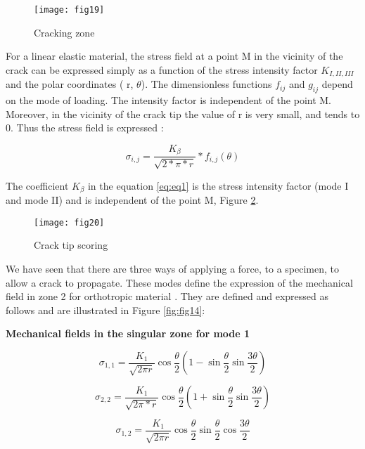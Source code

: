 \begin{figure}[htp]
	\centering
	\texttt{[image: fig19]}
	\caption{Cracking zone \cite{MoutouPitti2008phd}}
	\label{fig:fig19}
\end{figure}

For a linear elastic material, the stress field at a point M in the vicinity of the crack can be expressed simply as a function of the stress intensity factor $K_{I,II,III}$ and the polar coordinates ( r, $\theta$). The dimensionless functions $f_{ij}$  and  $g_{ij}$ depend on the mode of loading. The intensity factor is independent of the point M. Moreover, in the vicinity of the crack tip the value of r is very small, and tends to 0. Thus the stress field is expressed :

\begin{equation}
	\sigma_{i,j} = \frac{K_{\beta}}{\sqrt{2*\pi*r}}*f_{i,j}(\theta)
	\label{eq:eq1}
\end{equation}

The coefficient $K_\beta$ in the equation \ref{eq:eq1} is the stress intensity factor (mode I and mode II) and is independent of the point M, Figure \ref{fig:fig20}.


\begin{figure}[htp]
	\centering
	\texttt{[image: fig20]}
	\caption{Crack tip scoring}
	\label{fig:fig20}
\end{figure}

We have seen that there are three ways of applying a force, to a specimen, to allow a crack to propagate. These modes define the expression of the mechanical field in zone 2 for orthotropic material \cite{Odounga2018phd}. They are defined and expressed as follows and are illustrated in Figure \ref{fig:fig14}:

\textbf{Mechanical fields in the singular zone for mode 1}

\begin{equation}
	\sigma_{1,1} = \frac{K_{1}}{\sqrt{2 \pi r}} \cos{\frac{\theta}{2}}  \left( 1-\sin{\frac{\theta}{2}} \sin{\frac{3 \theta}{2}} \right)
\end{equation}

\begin{equation}
	\sigma_{2,2} = \frac{K_{1}}{\sqrt{2 \pi*r}} \cos{\frac{\theta}{2}}  \left( 1+\sin{\frac{\theta}{2}} \sin{\frac{3 \theta}{2}} \right)
\end{equation}

\begin{equation}
	\sigma_{1,2} = \frac{K_{1}}{\sqrt{2 \pi r}} \cos{\frac{\theta}{2}}  \sin{\frac{\theta}{2}} \cos{\frac{3 \theta}{2}}
\end{equation}

